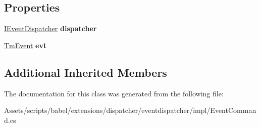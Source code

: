 \subsection*{Properties}
\begin{DoxyCompactItemize}
\item 
\hypertarget{classbabel_1_1extensions_1_1dispatcher_1_1eventdispatcher_1_1impl_1_1_event_command_a8e4b6a0b5469b654bb96bdf0c095916f}{\hyperlink{interfacebabel_1_1extensions_1_1dispatcher_1_1eventdispatcher_1_1api_1_1_i_event_dispatcher}{I\-Event\-Dispatcher} {\bfseries dispatcher}}\label{classbabel_1_1extensions_1_1dispatcher_1_1eventdispatcher_1_1impl_1_1_event_command_a8e4b6a0b5469b654bb96bdf0c095916f}

\item 
\hypertarget{classbabel_1_1extensions_1_1dispatcher_1_1eventdispatcher_1_1impl_1_1_event_command_a1459c725fc37fdcda43c9547d93419a0}{\hyperlink{classbabel_1_1extensions_1_1dispatcher_1_1eventdispatcher_1_1impl_1_1_tm_event}{Tm\-Event} {\bfseries evt}}\label{classbabel_1_1extensions_1_1dispatcher_1_1eventdispatcher_1_1impl_1_1_event_command_a1459c725fc37fdcda43c9547d93419a0}

\end{DoxyCompactItemize}
\subsection*{Additional Inherited Members}


The documentation for this class was generated from the following file\-:\begin{DoxyCompactItemize}
\item 
Assets/scripts/babel/extensions/dispatcher/eventdispatcher/impl/Event\-Command.\-cs\end{DoxyCompactItemize}
